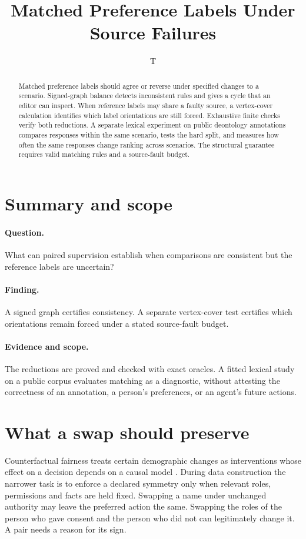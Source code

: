 \documentclass[11pt]{article}
\title{Matched Preference Labels Under Source Failures}
\author{T}
\date{}
\begin{document}
\maketitle

\begin{abstract}
Matched preference labels should agree or reverse under specified
changes to a scenario. Signed-graph balance detects inconsistent
rules and gives a cycle that an editor can inspect. When reference
labels may share a faulty source, a vertex-cover calculation
identifies which label orientations are still forced. Exhaustive
finite checks verify both reductions. A separate lexical experiment
on public deontology annotations compares responses within the same
scenario, tests the hard split, and measures how often the same
responses change ranking across scenarios. The structural guarantee
requires valid matching rules and a source-fault budget.
\end{abstract}

\section*{Summary and scope}
\paragraph{Question.} What can paired supervision establish when
comparisons are consistent but the reference labels are uncertain?
\paragraph{Finding.} A signed graph certifies consistency. A separate
vertex-cover test certifies which orientations remain forced under
a stated source-fault budget.
\paragraph{Evidence and scope.} The reductions are proved
and checked with exact oracles. A fitted lexical study on a public
corpus evaluates matching as a diagnostic, without attesting the
correctness of an annotation, a person's preferences, or an agent's
future actions.

\section{What a swap should preserve}
Counterfactual fairness treats certain demographic changes as
interventions whose effect on a decision depends on a causal
model \cite{kusner}. During data construction the narrower task is
to enforce a declared symmetry only when relevant roles, permissions
and facts are held fixed. Swapping a name under unchanged authority
may leave the preferred action the same. Swapping the roles of
the person who gave consent and the person who did not can legitimately
change it. A pair needs a reason for its sign.
\end{document}
